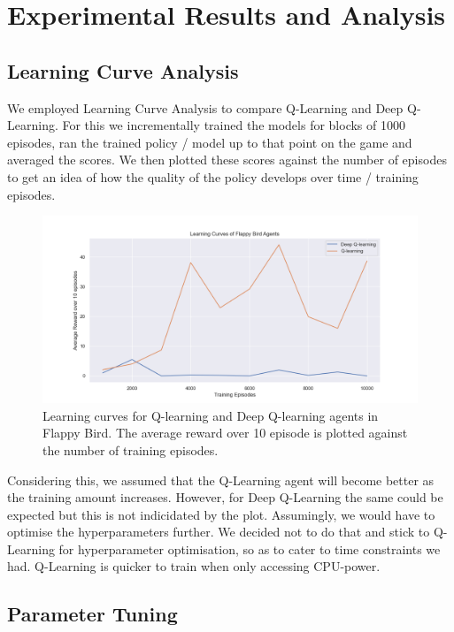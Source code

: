 \documentclass[a4paper,12pt]{article}
\begin{document}
\section{Experimental Results and Analysis}
\subsection{Learning Curve Analysis}
We employed Learning Curve Analysis to compare Q-Learning and Deep Q-Learning. For this we incrementally trained the models
for blocks of 1000 episodes, ran the trained policy / model up to that point on the game and averaged the scores. We then
plotted these scores against the number of episodes to get an idea of how the quality of the policy develops over time / training
episodes.

\begin{figure}[H]
    \centering
    \includegraphics[width=\textwidth]{training_deepq_vs_q_avg10samples.png}
    \caption{Learning curves for Q-learning and Deep Q-learning agents in Flappy Bird. The average reward over 10 episode is plotted against the number of training episodes.}
    \label{fig:learning_curves}
\end{figure}

Considering this, we assumed that the Q-Learning agent will become better as the training amount increases. However,
for Deep Q-Learning the same could be expected but this is not indicidated by the plot. Assumingly, we would have to optimise the
hyperparameters further. We decided not to do that and stick to Q-Learning for hyperparameter optimisation, so as to cater to time constraints we had.
Q-Learning is quicker to train when only accessing CPU-power.

\subsection{Parameter Tuning}
\end{document}
